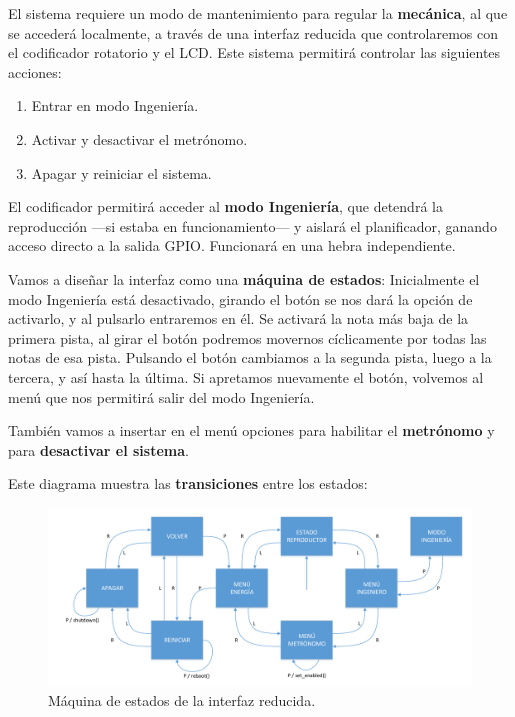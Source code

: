 El sistema requiere un modo de mantenimiento para regular la \textbf{mecánica}, al que se accederá localmente, a través de una interfaz reducida que controlaremos con el codificador rotatorio y el \acrshort{LCD}. Este sistema permitirá controlar las siguientes acciones:

\begin{enumerate}
	\item Entrar en modo Ingeniería.
	\item Activar y desactivar el metrónomo.
	\item Apagar y reiniciar el sistema.
\end{enumerate}

El codificador permitirá acceder al \textbf{modo Ingeniería}, que detendrá la reproducción ---si estaba en funcionamiento--- y  aislará el planificador, ganando acceso directo a la salida \acrshort{GPIO}. Funcionará en una hebra independiente.

Vamos a diseñar la interfaz como una \textbf{máquina de estados}: Inicialmente el modo Ingeniería está desactivado, girando el botón se nos dará la opción de activarlo, y al pulsarlo entraremos en él. Se activará la nota más baja de la primera pista, al girar el botón podremos movernos cíclicamente por todas las notas de esa pista. Pulsando el botón cambiamos a la segunda pista, luego a la tercera, y así hasta la última. Si apretamos nuevamente el botón, volvemos al menú que nos permitirá salir del modo Ingeniería.

También vamos a insertar en el menú opciones para habilitar el \textbf{metrónomo} y para \textbf{desactivar el sistema}.

Este diagrama muestra las \textbf{transiciones} entre los estados:

\smallskip

\begin{figure}[H]
	\noindent \begin{centering}
		\includegraphics[width=\linewidth]{capitulo4/engineer}
		\par\end{centering}
	\smallskip
	\caption{\label{fig:engineer} Máquina de estados de la interfaz reducida.}
\end{figure} 

